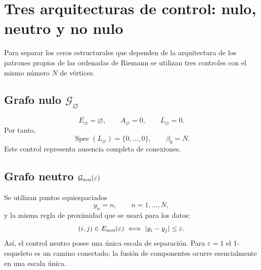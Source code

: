 \documentclass[11pt]{amsart}
\theoremstyle{definition}
\theoremstyle{remark}
\begin{document}
\section{Tres arquitecturas de control: nulo, neutro y no nulo}
Para separar los ceros estructurales que dependen de la arquitectura de los patrones propios de las ordenadas de Riemann se utilizan tres controles con el mismo número $N$ de vértices.

\subsection{Grafo nulo $\mathcal G_{\varnothing}$}
\begin{equation}
 E_{\varnothing}=\varnothing,\qquad A_{\varnothing}=0,\qquad L_{\varnothing}=0.
\end{equation}
Por tanto,
\begin{equation}
 \operatorname{Spec}(L_{\varnothing})=\{0,\ldots,0\},\qquad \beta_0=N.
\end{equation}
Este control representa ausencia completa de conexiones.

\subsection{Grafo neutro $\mathcal G_{\rm neu}(\varepsilon)$}
Se utilizan puntos equiespaciados
\begin{equation}
 y_n=n,\qquad n=1,\ldots,N,
\end{equation}
y la misma regla de proximidad que se usará para los datos:
\begin{equation}\label{eq:neutraledge}
 (i,j)\in E_{\rm neu}(\varepsilon)
 \iff |y_i-y_j|\le\varepsilon.
\end{equation}
Así, el control neutro posee una única escala de separación. Para $\varepsilon=1$ el 1-esqueleto es un camino conectado; la fusión de componentes ocurre esencialmente en una escala única.
\end{document}
